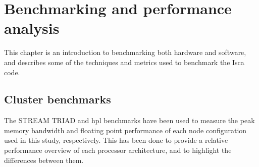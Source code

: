 \documentclass[a4paper,11pt]{report}
\begin{document}
\chapter{Benchmarking and performance analysis}
This chapter is an introduction to benchmarking both hardware and software, and describes some of the techniques and metrics used to benchmark the Isca code. 
\section{Cluster benchmarks}
The STREAM TRIAD and \gls{hpl} benchmarks have been used to measure the peak memory bandwidth and floating point performance of each node configuration used in this study, respectively. This has been done to provide a relative performance overview of each processor architecture, and to highlight the differences between them. 
\end{document}
